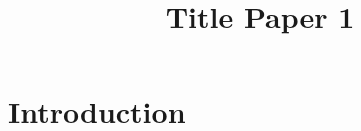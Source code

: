 \title{Title Paper 1}


\maketitle
\label{pap:01}

\begin{abstract}
\kant[1-2] 
\end{abstract}

\startcontents[chapters]

\section{Introduction} 
\kant[1-2] 









\printbibliography[heading = subbibliography]
\stopcontents[chapters]